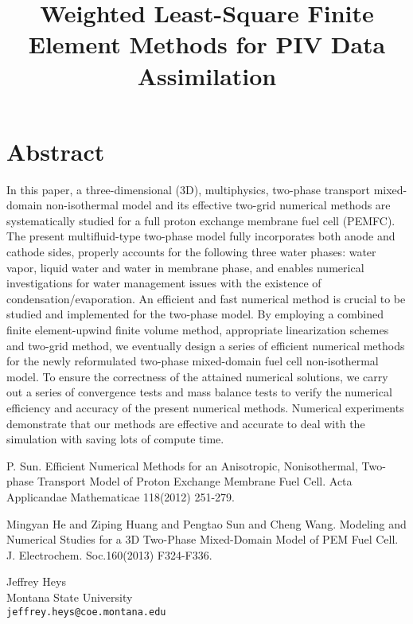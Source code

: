 \documentclass[article,A4,11pt]{llncs}%
\begin{document}
\section*{Abstract}
In this paper, a three-dimensional (3D), multiphysics, two-phase transport mixed-domain non-isothermal model and its effective two-grid numerical methods are systematically studied for a full proton exchange membrane fuel cell (PEMFC). The present multifluid-type two-phase model fully incorporates both anode and cathode sides, properly accounts for the following three water phases: water vapor, liquid water and water in membrane phase, and enables numerical investigations for water management issues with the existence of condensation/evaporation. An efficient and fast numerical method is crucial to be studied and implemented for the two-phase model. By employing a combined finite element-upwind finite volume method, appropriate linearization schemes and two-grid method, we eventually design a series of efficient numerical methods for the newly reformulated two-phase mixed-domain fuel cell non-isothermal model. To ensure the correctness of the attained numerical solutions, we carry out a series of convergence tests and mass balance tests to verify the numerical efficiency and accuracy of the present numerical methods. Numerical experiments demonstrate that our methods are effective and accurate to deal with the simulation with saving lots of compute time.


\begin{thebibliography}{10}
{\sc P. Sun}. {Efficient Numerical Methods for an Anisotropic, Nonisothermal, Two-phase Transport Model of Proton Exchange Membrane Fuel Cell}. Acta Applicandae Mathematicae 118(2012) 251-279.

{\sc Mingyan He and Ziping Huang and Pengtao Sun and Cheng Wang}. {Modeling and Numerical Studies for a 3D Two-Phase Mixed-Domain Model of PEM Fuel Cell}. J. Electrochem. Soc.160(2013) F324-F336.
\end{thebibliography}

\title{Weighted Least-Square Finite Element Methods for PIV Data Assimilation}
 \author{} \institute{}
\maketitle
\begin{center}
{\large Jeffrey Heys}\\
Montana State University\\
{\tt jeffrey.heys@coe.montana.edu}
\end{center}
\end{document}
